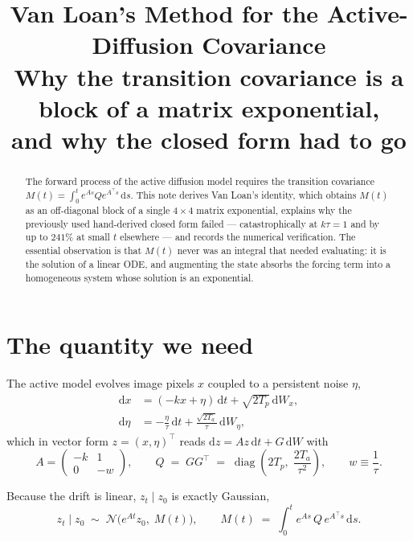 \documentclass[11pt]{article}
\title{Van Loan's Method for the Active-Diffusion Covariance\\
\large Why the transition covariance is a block of a matrix exponential,\\
and why the closed form had to go}
\author{}
\date{}
\newcommand{\Tp}{T_p}
\newcommand{\Ta}{T_a}
\newcommand{\kk}{k}
\newcommand{\tauu}{\tau}
\newcommand{\dd}{\mathrm{d}}
\DeclareMathOperator{\diag}{diag}
\begin{document}
\maketitle

\begin{abstract}
The forward process of the active diffusion model requires the transition covariance
$M(t)=\int_0^t e^{As}Qe^{A^{\!\top}\!s}\,\dd s$. This note derives Van Loan's identity,
which obtains $M(t)$ as an off-diagonal block of a single $4\times4$ matrix exponential,
explains why the previously used hand-derived closed form failed --- catastrophically at
$\kk\tauu=1$ and by up to $241\%$ at small $t$ elsewhere --- and records the numerical
verification. The essential observation is that $M(t)$ never was an integral that needed
evaluating: it is the solution of a linear ODE, and augmenting the state absorbs the
forcing term into a homogeneous system whose solution is an exponential.
\end{abstract}

\section{The quantity we need}

The active model evolves image pixels $x$ coupled to a persistent noise $\eta$,
\begin{align}
\dd x    &= (-\kk x + \eta)\,\dd t + \sqrt{2\Tp}\,\dd W_x, \label{eq:sdex}\\
\dd \eta &= -\frac{\eta}{\tauu}\,\dd t + \frac{\sqrt{2\Ta}}{\tauu}\,\dd W_\eta,
\label{eq:sdeeta}
\end{align}
which in vector form $z=(x,\eta)^{\!\top}$ reads $\dd z = Az\,\dd t + G\,\dd W$ with
\begin{equation}
A = \begin{pmatrix} -\kk & 1 \\ 0 & -w \end{pmatrix},
\qquad
Q \;=\; GG^{\!\top} \;=\; \diag\!\left(2\Tp,\; \frac{2\Ta}{\tauu^{2}}\right),
\qquad w \equiv \frac{1}{\tauu}.
\label{eq:AQ}
\end{equation}

Because the drift is linear, $z_t \mid z_0$ is exactly Gaussian,
\begin{equation}
z_t \mid z_0 \;\sim\; \mathcal{N}\!\big(e^{At}z_0,\; M(t)\big),
\qquad
M(t) \;=\; \int_0^t e^{As}\,Q\,e^{A^{\!\top}\!s}\,\dd s .
\label{eq:M}
\end{equation}
\end{document}
